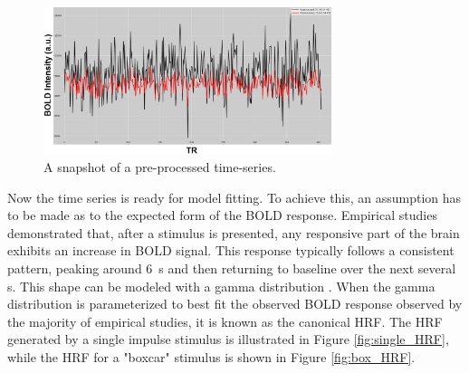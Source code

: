 \begin{figure}[htbp]
    \centering
    \includegraphics[width = 0.75\textwidth]{assets/images/preproc_and_unproc.png}
    \caption[Preprocessed Time-Series]{A snapshot of a pre-processed time-series.}
    \label{fig:P_TS}
\end{figure}

Now the time series is ready for model fitting. To achieve this, an assumption has to be made as to the expected form of the \gls{BOLD} response. Empirical studies \cite{Hirano2011, Martindale2003} demonstrated that, after a stimulus is presented, any responsive part of the brain exhibits an increase in \gls{BOLD} signal. This response typically follows a consistent pattern, peaking around \SI{6}{\second} and then returning to baseline over the next several \si{\second}. This shape can be modeled with a gamma distribution \cite{Andy_HRF}. When the gamma distribution is parameterized to best fit the observed \gls{BOLD} response observed by the majority of empirical studies, it is known as the canonical \gls{HRF}. The \gls{HRF} generated by a single impulse stimulus is illustrated in Figure \autoref{fig:single_HRF}, while the \gls{HRF} for a "boxcar" stimulus is shown in Figure \autoref{fig:box_HRF}.

